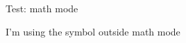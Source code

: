 \documentclass{article}
\begin{document}
Test: math mode

I'm using the symbol \theta outside math mode
\end{document}

